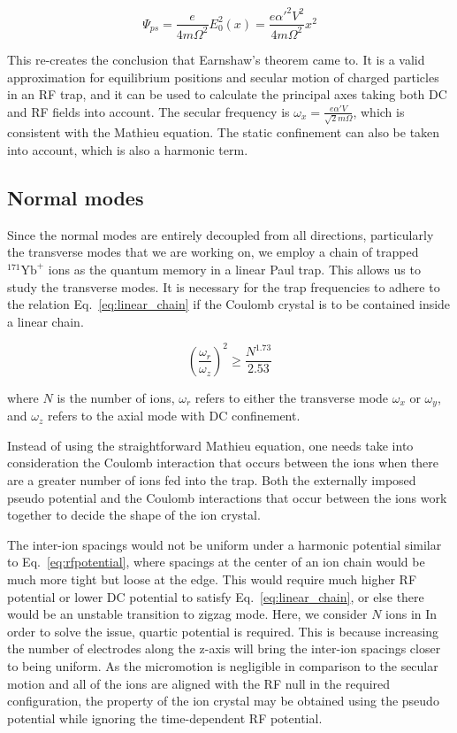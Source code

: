 \begin{equation}\label{eq:pseudo_potential}
    \Psi_{ps}=\frac{e}{4m\Omega^2}E_0^2(x)=\frac{e\alpha'^2V^2}{4m\Omega^2}x^2
\end{equation}

This re-creates the conclusion that Earnshaw's theorem came to. It is a valid approximation for equilibrium positions and secular motion of charged particles in an RF trap, and it can be used to calculate the principal axes taking both DC and RF fields into account. The secular frequency is \(\omega_x=\frac{e\alpha' V}{\sqrt{2}m\Omega}\), which is consistent with the Mathieu equation. The static confinement can also be taken into account, which is also a harmonic term.

\subsection{Normal modes}

Since the normal modes are entirely decoupled from all directions, particularly the transverse modes that we are working on, we employ a chain of trapped ${ }^{171} \mathrm{Yb}^{+}$ ions as the quantum memory in a linear Paul trap. This allows us to study the transverse modes. It is necessary for the trap frequencies to adhere to the relation Eq.~\eqref{eq:linear_chain} if the Coulomb crystal is to be contained inside a linear chain.

\begin{equation}\label{eq:linear_chain}
    \left(\frac{\omega_r}{\omega_z}\right)^2 \geq \frac{N^{1.73}}{2.53}
\end{equation}

where \(N\) is the number of ions, \(\omega_r\) refers to either the transverse mode \(\omega_x\) or \(\omega_y\), and \(\omega_z\) refers to the axial mode with DC confinement.

Instead of using the straightforward Mathieu equation, one needs take into consideration the Coulomb interaction that occurs between the ions when there are a greater number of ions fed into the trap. Both the externally imposed pseudo potential and the Coulomb interactions that occur between the ions work together to decide the shape of the ion crystal.

The inter-ion spacings would not be uniform under a harmonic potential similar to Eq.~\eqref{eq:rfpotential}, where spacings at the center of an ion chain would be much more tight but loose at the edge. This would require much higher RF potential or lower DC potential to satisfy Eq.~\eqref{eq:linear_chain}, or else there would be an unstable transition to zigzag mode. Here, we consider \(N\) ions in In order to solve the issue, quartic potential is required. This is because increasing the number of electrodes along the z-axis will bring the inter-ion spacings closer to being uniform. As the micromotion is negligible in comparison to the secular motion and all of the ions are aligned with the RF null in the required configuration, the property of the ion crystal may be obtained using the pseudo potential while ignoring the time-dependent RF potential.

